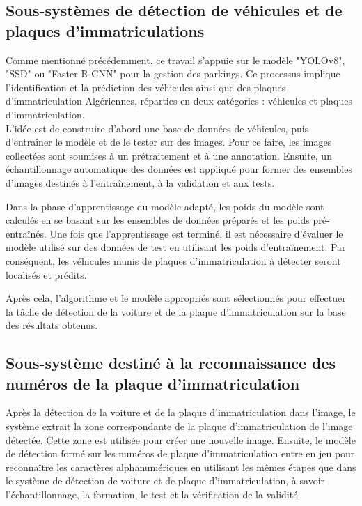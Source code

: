 \subsection{Sous-systèmes de détection de véhicules et de plaques d'immatriculations}
Comme mentionné précédemment, ce travail s'appuie sur le modèle "YOLOv8", "SSD" ou "Faster R-CNN" pour la gestion des parkings. Ce processus implique l'identification et la prédiction des véhicules ainsi que des plaques d'immatriculation Algériennes, réparties en deux catégories : véhicules et plaques d’immatriculation.
\\
L'idée est de construire d'abord une base de données de véhicules, puis d'entraîner le modèle et de le tester sur des images. Pour ce faire, les images collectées sont soumises à un prétraitement et à une annotation. Ensuite, un échantillonnage automatique des données est appliqué pour former des ensembles d'images destinés à l'entraînement, à la validation et aux tests.

Dans la phase d'apprentissage du modèle adapté, les poids du modèle sont calculés en se basant sur les ensembles de données préparés et les poids pré-entraînés. Une fois que l'apprentissage est terminé, il est nécessaire d'évaluer le modèle utilisé sur des données de test en utilisant les poids d'entraînement. Par conséquent, les véhicules munis de plaques d'immatriculation à détecter seront localisés et prédits.


Après cela, l'algorithme et le modèle appropriés sont sélectionnés pour effectuer la tâche de détection de la voiture et de la plaque d'immatriculation sur la base des résultats obtenus.

\subsection{ Sous-système destiné à la reconnaissance des numéros de la plaque d'immatriculation}\label{sec:ocr_by_object_detection}

Après la détection de la voiture et de la plaque d'immatriculation dans l'image, le système extrait la zone correspondante de la plaque d'immatriculation de l'image détectée. Cette zone est utilisée pour créer une nouvelle image. Ensuite, le modèle de détection formé sur les numéros de plaque d'immatriculation entre en jeu pour reconnaître les caractères alphanumériques en utilisant les mêmes étapes que dans le système de détection de voiture et de plaque d'immatriculation, à savoir l'échantillonnage, la formation, le test et la vérification de la validité.

